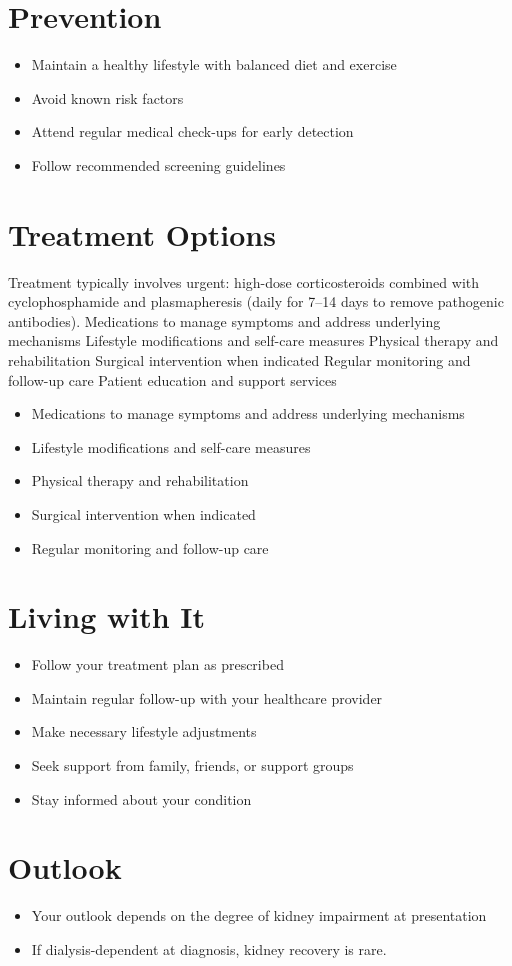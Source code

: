 \section{Prevention}
\begin{itemize}[noitemsep]
  \item Maintain a healthy lifestyle with balanced diet and exercise
  \item Avoid known risk factors
  \item Attend regular medical check-ups for early detection
  \item Follow recommended screening guidelines
\end{itemize}
\section{Treatment Options}
Treatment typically involves urgent: high-dose corticosteroids combined with cyclophosphamide and plasmapheresis (daily for 7--14 days to remove pathogenic antibodies). Medications to manage symptoms and address underlying mechanisms Lifestyle modifications and self-care measures Physical therapy and rehabilitation Surgical intervention when indicated Regular monitoring and follow-up care Patient education and support services

\begin{itemize}[noitemsep]
  \item Medications to manage symptoms and address underlying mechanisms
  \item Lifestyle modifications and self-care measures
  \item Physical therapy and rehabilitation
  \item Surgical intervention when indicated
  \item Regular monitoring and follow-up care
\end{itemize}
\section{Living with It}
\begin{itemize}[noitemsep]
  \item Follow your treatment plan as prescribed
  \item Maintain regular follow-up with your healthcare provider
  \item Make necessary lifestyle adjustments
  \item Seek support from family, friends, or support groups
  \item Stay informed about your condition
\end{itemize}
\section{Outlook}
\begin{itemize}[noitemsep]
  \item Your outlook depends on the degree of kidney impairment at presentation
  \item If dialysis-dependent at diagnosis, kidney recovery is rare.
\end{itemize}

